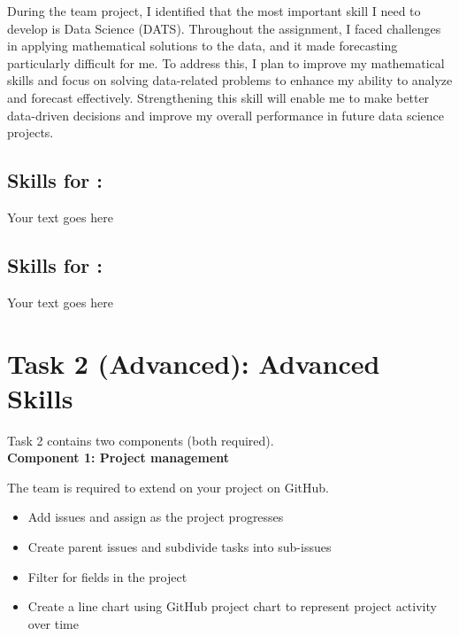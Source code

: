 \documentclass[a4paper, 11pt]{report}
\begin{document}
During the team project, I identified that the most important skill I need to develop is Data Science (DATS). Throughout the assignment, I faced challenges in applying mathematical solutions to the data, and it made forecasting particularly difficult for me. To address this, I plan to improve my mathematical skills and focus on solving data-related problems to enhance my ability to analyze and forecast effectively. Strengthening this skill will enable me to make better data-driven decisions and improve my overall performance in future data science projects.


\subsection{Skills for \majC: \studC}

Your text goes here

\subsection{Skills for \majD: \studD}

Your text goes here



\newpage
\section{Task 2 (Advanced): Advanced Skills}

Task 2 contains two components (both required).\\[2mm]

\textbf{Component 1: Project management}

The team is required to extend on your project on GitHub.

\begin{itemize}
    \item Add issues and assign as the project progresses
    \item Create parent issues and subdivide tasks into sub-issues
    \item Filter for fields in the project
    \item Create a line chart using GitHub project chart to represent project activity over time
\end{itemize} 

\vspace{4ex}
\end{document}
